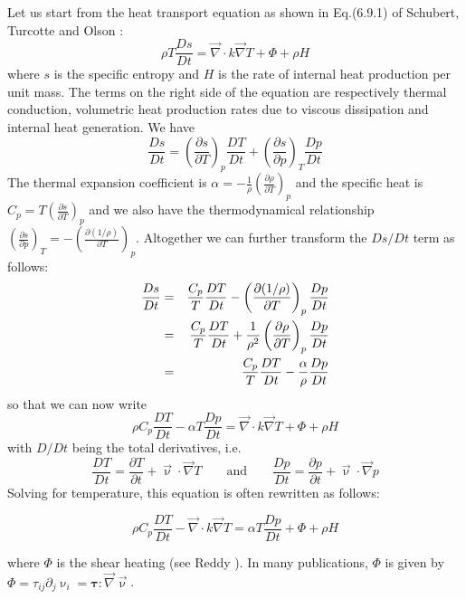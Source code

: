 \noindent 
Let us start from the heat transport equation as shown in Eq.(6.9.1)
of Schubert, Turcotte and Olson \cite{scto01}:
\begin{equation}
\rho T \frac{Ds}{Dt} = {\vec \nabla} \cdot k {\vec \nabla} T + \Phi + \rho H  
\end{equation}
where $s$ is the specific entropy and $H$ is the rate of internal heat production
per unit mass. The terms on the right side of the equation are respectively
thermal conduction, volumetric heat production rates
due to viscous dissipation and internal heat generation.
We have 
\[
\frac{Ds}{Dt} = 
\left( \frac{\partial s}{\partial T} \right)_p \frac{DT}{Dt}
+
\left( \frac{\partial s}{\partial p} \right)_T \frac{Dp}{Dt}
\]
The thermal expansion coefficient is
$\alpha = -\frac{1}{\rho} \left(\frac{\partial \rho}{\partial T} \right)_p$
and the specific heat is 
$C_p = T \left( \frac{\partial s}{\partial T} \right)_p$
and we also have the thermodynamical relationship
$
\left( \frac{\partial s}{\partial p}  \right)_T
=
-\left( \frac{\partial (1/\rho)}{\partial T}  \right)_p
$. 
Altogether we can further transform the $Ds/Dt$ term as follows:
\begin{eqnarray}
\frac{Ds}{Dt} 
&=& 
\frac{C_p}{T}\frac{DT}{Dt}-\left( \frac{\partial (1/\rho)}{\partial T}  \right)_p \frac{Dp}{Dt} \nonumber\\
&=& 
\frac{C_p}{T}\frac{DT}{Dt}+\frac{1}{\rho^2} \left( \frac{\partial \rho}{\partial T}\right)_p\frac{Dp}{Dt}\nonumber\\
&=& 
\frac{C_p}{T}\frac{DT}{Dt} - \frac{\alpha}{\rho} \frac{Dp}{Dt}\nonumber
\end{eqnarray}
so that we can now write
\begin{equation}
\rho C_p \frac{DT}{Dt} - \alpha T \frac{Dp}{Dt} = {\vec \nabla} \cdot k {\vec \nabla} T + \Phi + \rho H  
\end{equation}
with $D/Dt$ being the total derivatives, i.e. 
\begin{equation}
\frac{DT}{Dt} = \frac{\partial T}{\partial t} + {\vec \upnu}\cdot {\vec \nabla}T
\qquad
\text{and}
\qquad
\frac{Dp}{Dt} = \frac{\partial p}{\partial t} + {\vec \upnu}\cdot {\vec \nabla}p
\end{equation}
Solving for temperature, this equation is often rewritten as follows:
\begin{mdframed}[backgroundcolor=blue!5]
\begin{equation}
\rho C_p \frac{DT}{Dt} - {\vec \nabla} \cdot k {\vec \nabla} T =  \alpha T \frac{Dp}{Dt} + \Phi + \rho H  
\end{equation}
\end{mdframed}
where $\Phi$ is the shear heating (see Reddy \cite[p287]{reddybook2}). 
In many publications, $\Phi$ is given by 
$\Phi=\tau_{ij}\partial_j \upnu_i={\bm \tau}:{\vec \nabla}{\vec \upnu}$.

